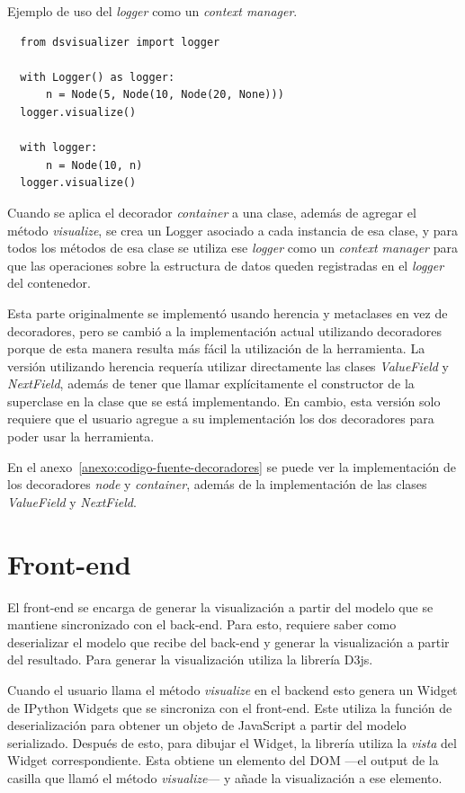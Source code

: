 \begin{listing}[h!]
  \caption{Ejemplo de uso del \textit{logger} como un \textit{context manager}.}
  \label{lst:ejemplo-logger-ctx-mgr}
  \begin{verbatim}
  from dsvisualizer import logger
  
  with Logger() as logger:
      n = Node(5, Node(10, Node(20, None)))
  logger.visualize()
  
  with logger:
      n = Node(10, n)
  logger.visualize()
  \end{verbatim}
\end{listing}

Cuando se aplica el decorador \textit{container} a una clase, además de agregar el método \textit{visualize}, se crea un Logger asociado a cada instancia de esa clase, y para todos los métodos de esa clase se utiliza ese \textit{logger} como un \textit{context manager} para que las operaciones sobre la estructura de datos queden registradas en el \textit{logger} del contenedor.

Esta parte originalmente se implementó usando herencia y metaclases en vez de decoradores, pero se cambió a la implementación actual utilizando decoradores porque de esta manera resulta más fácil la utilización de la herramienta. La versión utilizando herencia requería utilizar directamente las clases \textit{ValueField} y \textit{NextField}, además de tener que llamar explícitamente el constructor de la superclase en la clase que se está implementando. En cambio, esta versión solo requiere que el usuario agregue a su implementación los dos decoradores para poder usar la herramienta.

En el anexo~\ref{anexo:codigo-fuente-decoradores} se puede ver la implementación de los decoradores \textit{node} y \textit{container}, además de la implementación de las clases \textit{ValueField} y \textit{NextField}.

\section{Front-end}

El front-end se encarga de generar la visualización a partir del modelo que se mantiene sincronizado con el back-end. Para esto, requiere saber como deserializar el modelo que recibe del back-end y generar la visualización a partir del resultado. Para generar la visualización utiliza la librería D3js.

Cuando el usuario llama el método \textit{visualize} en el backend esto genera un Widget de IPython Widgets que se sincroniza con el front-end. Este utiliza la función de deserialización para obtener un objeto de JavaScript a partir del modelo serializado. Después de esto, para dibujar el Widget, la librería utiliza la \textit{vista} del Widget correspondiente. Esta obtiene un elemento del DOM ---el output de la casilla que llamó el método \textit{visualize}--- y añade la visualización a ese elemento.

